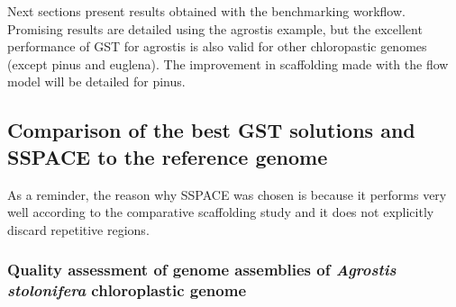 \documentclass[12pt]{article}
\begin{document}
Next sections present results obtained with the benchmarking workflow. Promising results are detailed using the agrostis example, but the excellent performance of GST for agrostis is also valid for other chloropastic genomes (except pinus and euglena). The improvement in scaffolding made with the flow model will be detailed for pinus.

\newpage
\subsection{Comparison of the best GST solutions and SSPACE to the reference genome}
As a reminder, the reason why SSPACE was chosen is because it performs very well according to the comparative scaffolding study \cite{u} and it does not explicitly discard repetitive regions.
\subsubsection{Quality assessment of genome assemblies of \textit{Agrostis stolonifera} chloroplastic genome}
\end{document}
